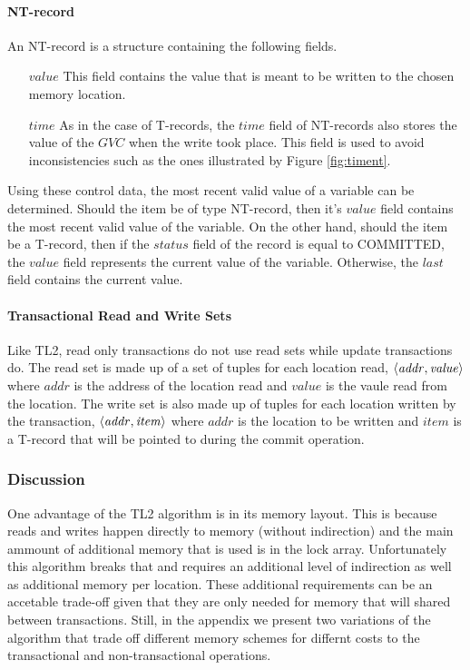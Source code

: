 \documentclass[11pt,letterpaper]{article}
\begin{document}
\paragraph{NT-record}
An NT-record is a structure containing the following fields.
\begin{itemize}
\vspace{-0.1cm}
\item[$\mathit{value}$]
This field contains the value that is meant to be written to the chosen 
memory location.
\vspace{-0.2cm}
\item[$\mathit{time}$]
As in the case of T-records, the $\mathit{time}$ field of NT-records 
also stores the value 
of the $\mathit{GVC}$ when the write took place. This field is 
used to avoid inconsistencies such as the ones illustrated by Figure 
\ref{fig:timent}. 
\end{itemize}

Using these control data, the most  recent valid value  of a variable  can be
determined.  Should the item be of type NT-record,
then it's $\mathit{value}$ field contains the most  
recent valid value  of the variable. On the other hand,  should the item
 be a  T-record, then if the $\mathit{status}$ field of
the record is equal to COMMITTED,  
the $\mathit{value}$ field represents the current value of the variable. Otherwise, the
$\mathit{last}$ field contains the current value.

\paragraph{Transactional Read and Write Sets}
Like TL2, read only transactions do not use read sets while update transactions do.
The read set is made up of a set of tuples for each location read, $\left \langle \mathit{addr, value} \right \rangle $
where $\mathit{addr}$ is the address of the location read and $\mathit{value}$ is the vaule
read from the location.
The write set is also made up of tuples for each location written by the transaction,
$\left \langle \mathit{addr, item} \right \rangle $ where $\mathit{addr}$ is the location to be written
and $\mathit{item}$ is a T-record that will be pointed to during the commit operation.

\subsubsection{Discussion}
One advantage of the TL2 algorithm is in its memory layout.
This is because reads and writes happen directly to memory (without indirection)
and the main ammount of additional memory that is used is in the lock array.
Unfortunately this algorithm breaks that and requires an additional level of indirection
as well as additional memory per location.
These additional requirements can be an accetable trade-off given that they are only
needed for memory that will shared between transactions.
Still, in the appendix we present two variations of the algorithm that trade
off different memory schemes for differnt costs to the transactional and
non-transactional operations.
\end{document}
